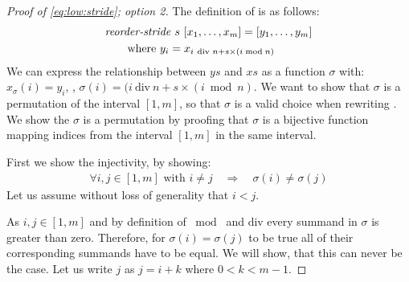 \begin{proof}[Proof of \autoref{eq:low:stride}; option 2]
  The definition of \reorderStride is as follows:
  \begin{align*}
    &\text{\textit{reorder-stride}}\ s\ [x_1, \ldots, x_m] = [y_1, \ldots, y_m]\\
    &\qquad \text{where}\ y_i = x_{i\ \text{\normalfont div } n + s\times (i \bmod{n})}
  \end{align*}
  We can express the relationship between $ys$ and $xs$ as a function $\sigma$ with: $x_\sigma(i) = y_i$, \ie, $\sigma(i) = (i\ \text{div}\ n + s\times (i \bmod{n})$.
  We want to show that $\sigma$ is a permutation of the interval $[1, m]$, so that $\sigma$ is a valid choice when rewriting \reduce.
  We show the $\sigma$ is a permutation by proofing that $\sigma$ is a bijective function mapping indices from the interval $[1,m]$ in the same interval.

  First we show the injectivity, by showing:
  \begin{align*}
    \forall i, j \in [1, m] \text{ with } i\neq j \quad \Rightarrow \quad \sigma(i)\neq \sigma(j)
  \end{align*}
  Let us assume without loss of generality that $i< j$.

%
  As $i,j\in [1,m]$ and by definition of $\bmod{}$ and div every summand in $\sigma$ is greater than zero.
  Therefore, for $\sigma(i) = \sigma(j)$ to be true all of their corresponding summands have to be equal.
  We will show, that this can never be the case.
  Let us write $j$ as $j=i+k$ where $0<k<m-1$.


\end{proof}
